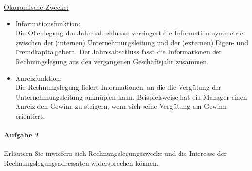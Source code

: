 \documentclass[paper=a4, fontsize=11pt]{scrartcl}
\numberwithin{equation}{section}
\numberwithin{figure}{section}
\numberwithin{table}{section}
\begin{document}
\underline{Ökonomische Zwecke:}
\begin{itemize}
\item Informationsfunktion: \\
Die Offenlegung des Jahresabschlusses verringert die Informationssymmetrie zwischen der (internen) Unternehmungsleitung und der (externen) Eigen- und Fremdkapitalgebern. Der Jahresabschluss fasst die Informationen der Rechnungslegung aus den vergangenen Geschäftsjahr zusammen.

\item Anreizfunktion: \\
Die Rechnungslegung liefert Informationen, an die die Vergütung der Unternehmungsleitung anknüpfen kann. Beispielsweise hat ein Manager einen Anreiz den Gewinn zu steigern, wenn sich seine Vergütung am Gewinn orientiert.
\end{itemize}

\paragraph{Aufgabe 2}
Erläutern Sie inwiefern sich Rechnungslegungszwecke und die Interesse der Rechnungslegungsadressaten widersprechen können. \\
\end{document}
